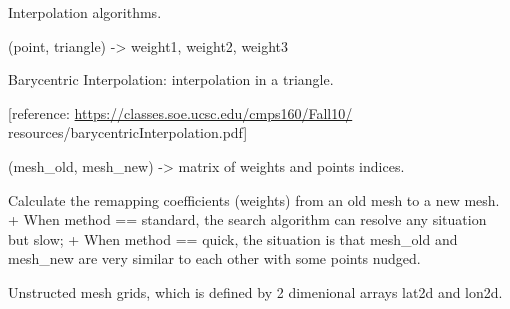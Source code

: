 \documentclass[letterpaper,10pt,english]{sphinxmanual}
\begin{document}

\begin{fulllineitems}
\label{code:pyesg.Interp}
Interpolation algorithms.

\begin{fulllineitems}
\label{code:pyesg.Interp.barycentric}
(point, triangle) -\textgreater{} weight1, weight2, weight3

Barycentric Interpolation: interpolation in a triangle.

{[}reference: \href{https://classes.soe.ucsc.edu/cmps160/Fall10/}{https://classes.soe.ucsc.edu/cmps160/Fall10/}
resources/barycentricInterpolation.pdf{]}

\end{fulllineitems}


\begin{fulllineitems}
\label{code:pyesg.Interp.regrid}
(mesh\_old, mesh\_new) -\textgreater{} matrix of weights and points indices.

Calculate the remapping coefficients (weights)
from an old mesh to a new mesh.
+ When method == standard,
the search algorithm can resolve any situation but slow;
+ When method == quick,
the situation is that mesh\_old and mesh\_new are very similar
to each other with some points nudged.

\end{fulllineitems}


\end{fulllineitems}


\begin{fulllineitems}
\label{code:pyesg.Mesh}
Unstructed mesh grids, which is defined by
2 dimenional arrays lat2d and lon2d.

\end{fulllineitems}

\end{document}
